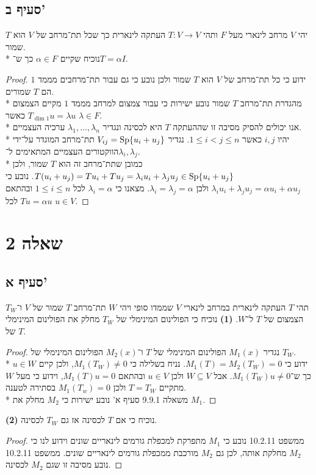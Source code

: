 \subsection{סעיף ב'}
יהי $V$ מרחב לינארי מעל $F$ ותהי $T : V \to V$ העתקה לינארית כך שכל תת־מרחב של $V$ הוא $T$ שמור. \\*
נוכיח שקיים $\alpha \in F$ כך ש־$T = \alpha I$.
\begin{proof}
	ידוע כי כל תת־מרחב של $V$ הוא $T$ שמור ולכן נובע כי גם עבור תת־מרחבים מממד $1$ הם $T$ שמורים. \\*
	מהגדרת תת־מרחב $T$ שמור נובע ישירות כי עבור צמצום למרחב מממד $1$ מקיים הצמצום $T_{\dim 1} u = \lambda u$ כאשר $\lambda \in F$. \\*
	אנו יכולים להסיק מסיבה זו שההעתקה $T$ היא לכסינה ונגדיר $\lambda_1, \hdots, \lambda_n$ ערכיה העצמיים. \\*
	יהיו $i, j$ כאשר $1 \le i < j \le n$. נגדיר $V_{ij} = \operatorname{Sp}\{ u_i + u_j \}$ תת־מרחב המוגדר על־ידי הווקטורים העצמיים המתאימים ל־$\lambda_i, \lambda_j$. \\*
	כמובן שתת־מרחב זה הוא $T$ שמור, ולכן $T(u_i + u_j) = T u_i + T u_j = \lambda_i u_i + \lambda_j u_j \in \operatorname{Sp}\{ u_i + u_j \}$.
	נובע כי $\lambda_i u_i + \lambda_j u_j = \alpha u_i + \alpha u_j$ ולכן $\lambda_i = \lambda_j = \alpha$.
	מצאנו כי $\lambda_i = \alpha$ לכל $1 \le i \le n$ ובהתאם $T u = \alpha u$ לכל $u \in V$.
\end{proof}

\section{שאלה 2}
\subsection{סעיף א'}
תהי $T$ העתקה לינארית במרחב לינארי $V$ שממדו סופי ויהי $W$ תת־מרחב $T$ שמור של $V$ ו־$T_W$ הצמצום של $T$ ל־$W$.
\textbf{(1)}
נוכיח כי הפולינום המינימלי של $T_W$ מחלק את הפולינום המינימלי של $T$.
\begin{proof}
	נגדיר $M_1(x)$ הפולינום המינימלי של $T$ ו־$M_2(x)$ הפולינום המינימלי של $T_W$. \\*
	ידוע כי $M_1(T) = M_2(T_W) = 0$. נניח בשלילה כי $M_1(T_W) \ne 0$, ולכן קיים $u \in W$ כך ש־$M_1(T_W) u \ne 0$.
	אבל $W \subseteq V$ ולכן $u \in V$ ובהתאם $M_1(T) u = 0$, וידוע כי מעל $W$ מתקיים $T = T_W$ ולכן $M_1(T_w) = 0$ בסתירה לטענה. \\*
	משאלה 9.9.1 סעיף א' נובע ישירות כי $M_2$ מחלק את $M_1$.
\end{proof}
\textbf{(2)}
נוכיח כי אם $T$ לכסינה אז גם $T_W$ לכסינה.
\begin{proof}
	ממשפט 10.2.11 נובע כי $M_1$ מתפרקת למכפלת גורמים לינאריים שונים וידוע לנו כי $M_2$ מחלקת אותה,
	לכן גם $M_2$ מורכבת ממכפלת גורמים לינאריים שונים. ממשפט 10.2.11 נובע מסיבה זו שגם $M_2$ לכסינה.
\end{proof}

